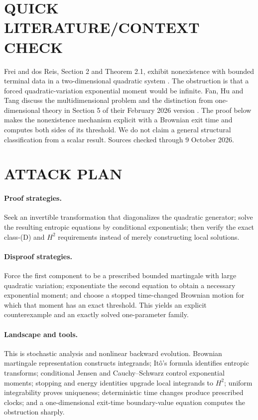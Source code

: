 \documentclass[11pt,a4paper]{article}
\theoremstyle{definition}
\theoremstyle{remark}
\begin{document}
\section{QUICK LITERATURE/CONTEXT CHECK}
Frei and dos Reis, Section 2 and Theorem 2.1, exhibit nonexistence with bounded terminal data in a two-dimensional quadratic system \cite{c65-fdr}. The obstruction is that a forced quadratic-variation exponential moment would be infinite. Fan, Hu and Tang discuss the multidimensional problem and the distinction from one-dimensional theory in Section 5 of their February 2026 version \cite{c65-fht}. The proof below makes the nonexistence mechanism explicit with a Brownian exit time and computes both sides of its threshold. We do not claim a general structural classification from a scalar result. Sources checked through 9 October 2026.

\section{ATTACK PLAN}
\paragraph{Proof strategies.}
Seek an invertible transformation that diagonalizes the quadratic generator; solve the resulting entropic equations by conditional exponentials; then verify the exact class-(D) and $H^2$ requirements instead of merely constructing local solutions.

\paragraph{Disproof strategies.}
Force the first component to be a prescribed bounded martingale with large quadratic variation; exponentiate the second equation to obtain a necessary exponential moment; and choose a stopped time-changed Brownian motion for which that moment has an exact threshold. This yields an explicit counterexample and an exactly solved one-parameter family.

\paragraph{Landscape and tools.}
This is stochastic analysis and nonlinear backward evolution. Brownian martingale representation constructs integrands; It\^o's formula identifies entropic transforms; conditional Jensen and Cauchy--Schwarz control exponential moments; stopping and energy identities upgrade local integrands to $H^2$; uniform integrability proves uniqueness; deterministic time changes produce prescribed clocks; and a one-dimensional exit-time boundary-value equation computes the obstruction sharply.
\end{document}
